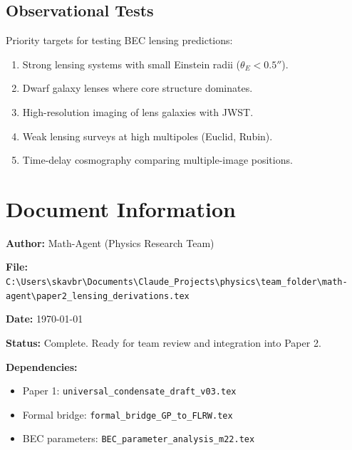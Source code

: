 \documentclass[11pt,a4paper]{article}
\theoremstyle{definition}
\theoremstyle{remark}
\begin{document}
\subsection{Observational Tests}

Priority targets for testing BEC lensing predictions:

\begin{enumerate}[leftmargin=*, itemsep=0.2em]
\item Strong lensing systems with small Einstein radii ($\theta_E < 0.5''$).
\item Dwarf galaxy lenses where core structure dominates.
\item High-resolution imaging of lens galaxies with JWST.
\item Weak lensing surveys at high multipoles (Euclid, Rubin).
\item Time-delay cosmography comparing multiple-image positions.
\end{enumerate}

\section*{Document Information}

\textbf{Author:} Math-Agent (Physics Research Team)

\textbf{File:} \texttt{C:\textbackslash Users\textbackslash skavbr\textbackslash Documents\textbackslash Claude\_Projects\textbackslash physics\textbackslash team\_folder\textbackslash math-agent\textbackslash paper2\_lensing\_derivations.tex}

\textbf{Date:} \today

\textbf{Status:} Complete. Ready for team review and integration into Paper 2.

\textbf{Dependencies:}
\begin{itemize}
\item Paper 1: \texttt{universal\_condensate\_draft\_v03.tex}
\item Formal bridge: \texttt{formal\_bridge\_GP\_to\_FLRW.tex}
\item BEC parameters: \texttt{BEC\_parameter\_analysis\_m22.tex}
\end{itemize}
\end{document}
